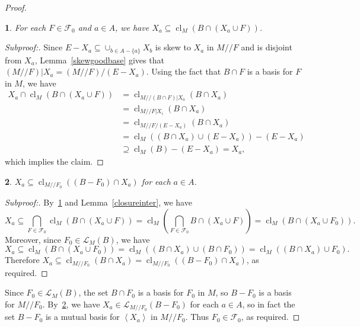 \documentclass{amsart}
\theoremstyle{plain}
\newtheorem{claim}{}[theorem]
\theoremstyle{definition}
\newcommand{\cF}{\mathcal{F}}
\newcommand{\cL}{\mathcal{L}}
\newcommand{\dcon}{/ \!\! /}
\DeclareMathOperator{\cl}{cl}
\newcommand{\con}{/}
\newcommand{\br}[1]{\left(#1\right)}
\newcommand{\ab}[1]{\left\langle#1\right\rangle}
\renewcommand{\ss}{\subseteq}
\newenvironment{subproof}[1][\proofname]{%
  \renewcommand{\qedsymbol}{$\blacksquare$}%
  \begin{proof}[Subproof:]%
}{%
  \end{proof}%
}
\begin{document}
\begin{proof}
   \begin{claim}\label{gc1}
    For each $F \in \cF_0$ and $a \in A$, we have $X_a \ss \cl_M(B \cap (X_a \cup F))$. 
  \end{claim}
  \begin{subproof}
    Since $E-X_a \ss \cup_{b \in A - \{a\}}X_b$ is skew to $X_a$ in $M \dcon F$ and is disjoint from $X_a$,
    Lemma~\ref{skewgoodbase} gives that $(M \dcon F) | X_a = (M \dcon F) \con (E-X_a)$. 
    Using the fact that $B \cap F$ is a basis for $F$ in $M$, we have 
    \begin{align*}
      X_a \cap \cl_M(B \cap (X_a \cup F)) &= \cl_{M \dcon (B \cap F) | X_a}(B \cap X_a) \\ 
      &= \cl_{M \dcon F | X_i}(B \cap X_a) \\
      &= \cl_{M \dcon F \con (E - X_a)}(B \cap X_a) \\
      &= \cl_M((B \cap X_a) \cup (E-X_a)) - (E - X_a) \\
      &\supseteq \cl_M(B) - (E-X_a) = X_a,
    \end{align*}
    which implies the claim. 
  \end{subproof}
    \begin{claim}\label{gc2}
    $X_a \ss \cl_{M \dcon F_0}((B - F_0) \cap X_a)$ for each $a \in A$.
  \end{claim}
  \begin{subproof}
  By~\ref{gc1} and Lemma~\ref{closureinter}, we have 
  \[X_a \ss \bigcap_{F \in \cF_0} \cl_M\br{B \cap (X_a \cup F)} = \cl_M\br{\bigcap_{F \in \cF_0} B \cap (X_a \cup F)} = 
  \cl_M(B \cap \br{X_a \cup F_0}).\]
  Moreover, since $F_0 \in \cL_M(B)$, we have 
  \[X_a \ss \cl_M(B \cap (X_a \cup F_0)) = \cl_M((B \cap X_a) \cup (B \cap F_0)) = \cl_M((B \cap X_a) \cup F_0).\] 
  Therefore $X_a \ss \cl_{M \dcon F_0}(B \cap X_a) = \cl_{M \dcon F_0}((B-F_0) \cap X_a)$, as required. 
  \end{subproof}
  Since $F_0 \in \cL_M(B)$, the set $B \cap F_0$ is a basis for $F_0$ in $M$, so $B - F_0$ is a basis for $M \dcon F_0$. 
  By~\ref{gc2}, we have $X_a \in \cL_{M \dcon F_0}(B - F_0)$ for each $a \in A$, so in fact the set $B - F_0$ is a mutual 
  basis for $\ab{X_a}$ in $M \dcon F_0$. Thus $F_0 \in \cF_0$, as required. 
\end{proof}
\end{document}
